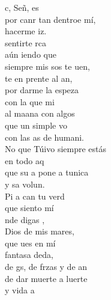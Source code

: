 \begin{cancion}%
	c, Señ,  es \\
	por canr tan dentroe mí,\\
	 hacerme iz.\\
	 sentirte rca\\
	aún iendo que\\
	siempre mis sos te uen,\\
	te en prente al an,\\
	por darme la espeza  \\
	con la que mi \\
	al maana con algos \\
	que un simple vo\\
	con las as de humani.\\
	No que Túivo siempre estás\\
	en todo aq\\
	que su a pone a tunica\\
	y sa volun.\\
	Pi a can tu verd \\
	que siento  mí\\
	nde digas ,\\
	Dios de mis mares,\\
	que ues en mí\\
	 fantasa deda,\\
	de gs, de frzas y de an\\
	de dar muerte a luerte \\
	y vida a \\

\end{cancion}
